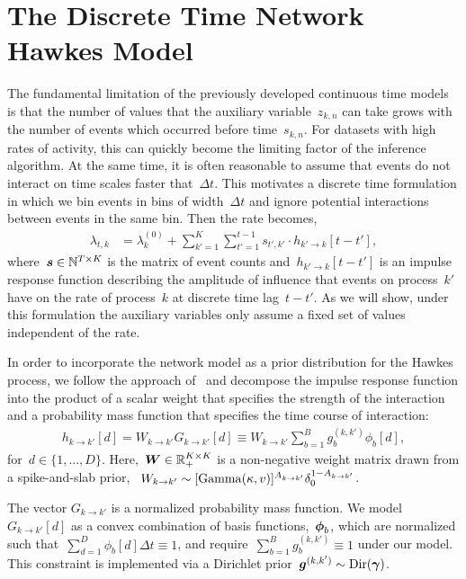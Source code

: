 \section{The Discrete Time Network Hawkes Model}
The fundamental limitation of the previously developed continuous time models is that the number of values that the auxiliary variable~$z_{k,n}$ can take grows with the number of events which occurred before time~$s_{k,n}$. For datasets with high rates of activity, this can quickly become the limiting factor of the inference algorithm.  At the same time, it is often reasonable to assume that events do not interact on time scales faster that~$\Delta t$. This motivates a discrete time formulation in which we bin events in bins of width~$\Delta t$ and ignore potential interactions between events in the same bin. Then the rate becomes,
\begin{align}
\label{eq:cont_hawkes_rate}
 \lambda_{t,k} &= \lambda_k^{(0)} + \sum_{k' = 1}^K \sum_{t'=1}^{t-1} s_{t',k'} \cdot h_{k' \to k}[t-t'],
\end{align}
where~${\boldsymbol{s} \in \mathbb{N}^{T\times K}}$ is the matrix of event counts and~${h_{k' \to k}[t-t']}$ is an impulse response function describing the amplitude of influence that events on process~$k'$ have on the rate of process~$k$ at discrete time lag~${t-t'}$. As we will show, under this formulation the auxiliary variables only assume a fixed set of values independent of the rate.

In order to incorporate the network model as a prior distribution for the Hawkes process, we follow the approach of~\citet{Linderman-2014} and decompose the impulse response function into the product of a scalar weight that specifies the strength of the interaction and a probability mass function that specifies the time course of interaction:
\begin{align*}
h_{k \to k'}[d]=W_{k \to k'} G_{k \to k'}[d] \equiv W_{k \to k'} \sum_{b=1}^B g_{b}^{(k,k')} \phi_b[d],
\end{align*}
for~${d\in\{1,\ldots,D\}}$. 
Here,~${\boldsymbol{W}\in\mathbb{R}_+^{K\times K}}$ is a non-negative weight matrix drawn from a spike-and-slab prior,
~${W_{k\to k'} \sim [\mathrm{Gamma}(\kappa, v)]^{A_{k\to k'}} \delta_0^{1-A_{k \to k'}}}$.

The vector $G_{k \to k'}$ is a normalized probability mass function.
We model~${G_{k \to k'}[d]}$ as a convex combination of basis functions,~$\boldsymbol{\phi}_b$, which are normalized such that~${\sum_{d=1}^D \phi_b[d] \Delta t \equiv 1}$, and require~${\sum_{b=1}^B g_b^{(k,k')} \equiv 1}$ under our model. 
This constraint is implemented via a Dirichlet prior~$\boldsymbol{g}^{(k,k')} \sim \mathrm{Dir}(\boldsymbol{\gamma})$.

